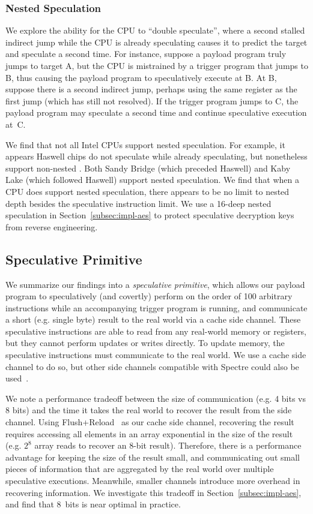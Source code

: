 \subsubsection{Nested Speculation}
\label{sssec:nested-spec}

We explore the ability for the CPU to ``double speculate'', where a second
stalled indirect jump while the CPU is already speculating causes it to predict
the target and
speculate a second time. For instance, suppose a payload program truly jumps to
target A, but the CPU is mistrained by a trigger program that jumps to B, thus
causing the payload program to speculatively execute at B. At B, suppose there
is a second indirect jump, perhaps using the same register as the first jump
(which has still not resolved). If the trigger program jumps to C, the payload
program may speculate a second time and continue speculative execution at~C.

We find that not all Intel CPUs support nested speculation. For
example, it appears Haswell chips do not speculate while already speculating,
but nonetheless support non-nested \speculake. Both Sandy Bridge (which
preceded Haswell) and Kaby Lake (which followed Haswell) support nested
speculation. We find that when a CPU does support nested speculation, there
appears to be no limit to nested depth besides the speculative instruction
limit. We use a 16-deep nested speculation in Section~\ref{subsec:impl-aes}
to protect speculative decryption keys from reverse
engineering.

\subsection{Speculative Primitive}

We summarize our findings into a \emph{speculative primitive}, which allows our
payload program to speculatively (and covertly) perform on the order of 100
arbitrary instructions while an accompanying trigger program is running, and
communicate a short (e.g. single byte) result to the real world via a cache side
channel. These speculative instructions are able to read from any real-world
memory or registers, but they cannot perform updates or writes directly. To
update memory, the speculative instructions must communicate to the real world.
We use a cache side channel to do so, but other side channels compatible with
Spectre could also be used~\cite{kiriansky2018speculative}.

We note a performance tradeoff between the size of communication (e.g. 4 bits vs
8 bits) and the time it takes the real world to recover the result from the side
channel. Using Flush+Reload~\cite{yarom2014flush+} as our cache side channel,
recovering the result requires accessing all elements in an array exponential in
the size of the result (e.g. $2^8$ array reads to recover an 8-bit result).
Therefore, there is a performance advantage for keeping the size of the result
small, and communicating out small pieces of information that are aggregated by
the real world over multiple speculative executions. Meanwhile, smaller channels
introduce more overhead in recovering information. We investigate this tradeoff
in Section~\ref{subsec:impl-aes}, and find that 8~bits is near optimal in
practice.

